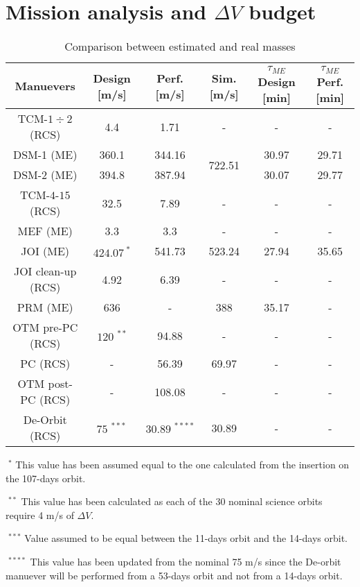 \section{Mission analysis and \texorpdfstring{$\Delta V$}{Delta-V} budget}
\label{sec:ma_and_dv}

\begin{table}[H]
    \renewcommand{\arraystretch}{1.3}
    \centering
    \begin{tabular}{|c|c|c|c|c|c|}
        \hline
        \textbf{Manuevers} & \textbf{Design} [m/s] & \textbf{Perf.} [m/s] & \textbf{Sim.} [m/s] & \textbf{$\tau_{ME}$ Design} [min] & \textbf{$\tau_{ME}$ Perf.} [min]  \\
        \hline
        TCM\cite{junno_inner}-$1\div2$ (RCS) & 4.4 & 1.71 & - & - & - \\
        \hline     
        \multicolumn{1}{|c|}{DSM\cite{junno_inner}-1 (ME)} & \multicolumn{1}{c|}{360.1} & \multicolumn{1}{c|}{344.16} & \multirow{2}{*}{722.51} & \multicolumn{1}{c|}{30.97} & \multicolumn{1}{c|}{29.71} \\
        \cline{1-3}
        \cline{5-6}
        \multicolumn{1}{|c|}{DSM\cite{junno_inner}-2 (ME)} & \multicolumn{1}{c|}{394.8} & \multicolumn{1}{c|}{387.94} & & \multicolumn{1}{c|}{30.07} & \multicolumn{1}{c|}{29.77} \\
        \hline
        TCM\cite{junno_inner}-$4\text{-}15$ (RCS) & 32.5 & 7.89 & - & - & - \\
        \hline
        MEF\cite{junno_inner} (ME) & 3.3 & 3.3 & - & - & - \\
        \hline
        JOI\cite{otm} (ME) & $424.07^{\;*}$ & 541.73 & 523.24 & 27.94 & 35.65 \\
        \hline 
        JOI\cite{otm} clean-up (RCS) & 4.92 & 6.39 & - & - & - \\
        \hline
        PRM\cite{otm} (ME) & 636 & - & 388 & 35.17 & - \\
        \hline
        OTM\cite{nasa_otm} pre-PC (RCS) & $120^{\;**}$ & 94.88 & - & - & - \\
        \hline 
        PC (RCS) & - & 56.39 & 69.97 & - & - \\
        \hline
        OTM post-PC (RCS) & - & 108.08 & - & - & - \\
        \hline
        De-Orbit\cite{spaceflight101} (RCS) & $75^{\;***}$ & $30.89^{\;****} $& 30.89 & - & -\\
        \hline
    \end{tabular}
    \caption{Comparison between estimated and real masses}
    \label{table:masses}
\end{table}

$\;^{*}$ This value has been assumed equal to the one calculated from the insertion on the 107-days orbit. 

$\;^{**}$ This value has been calculated as each of the 30 nominal science orbits require 4 m/s of $\Delta V$.

$\;^{***}$ Value assumed to be equal between the 11-days orbit and the 14-days orbit. 

$\;^{****}$ This value has been updated from the nominal 75 m/s since the De-orbit manuever will be performed from a 53-days orbit and not from a 14-days orbit. 
